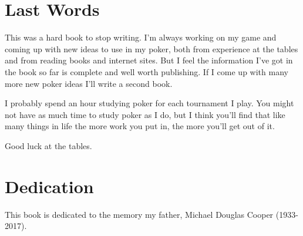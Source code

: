 \section*{Last Words}

This was a hard book to stop writing. I'm always working on my game
and coming up with new ideas to use in my poker, both from experience
at the tables and from reading books and internet sites. But I feel the
information I've got in the book so far is complete and well worth
publishing. If I come up with many more new poker ideas I'll write
a second book.

I probably spend an hour studying poker for each tournament I play.
You might not have as much time to study poker as I do, but I think you'll
find that like many things in life the more work you put in, the
more you'll get out of it.

Good luck at the tables.

\section*{Dedication}

This book is dedicated to the memory my father,
Michael Douglas Cooper (1933-2017).





